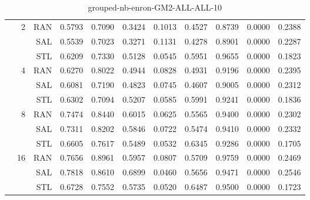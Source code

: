 \begin{center}
\begin{table}[htbp]
\begin{center}
\begin{tabular}{ | r | r | r | r | r | r | r | r | r | r | r |}
 & \multirow{3}{*}{2} & RAN & 0.5793 & 0.7090 & 0.3424 & 0.1013 & 0.4527 & 0.8739 & 0.0000 & 0.2388\\ \cline{3-11}
 &   & SAL & 0.5539 & 0.7023 & 0.3271 & 0.1131 & 0.4278 & 0.8901 & 0.0000 & 0.2287\\ \cline{3-11}
 &   & STL & 0.6209 & 0.7330 & 0.5128 & 0.0545 & 0.5951 & 0.9655 & 0.0000 & 0.1823\\ \cline{2-11}
 & \multirow{3}{*}{4} & RAN & 0.6270 & 0.8022 & 0.4944 & 0.0828 & 0.4931 & 0.9196 & 0.0000 & 0.2395\\ \cline{3-11}
 &   & SAL & 0.6081 & 0.7190 & 0.4823 & 0.0745 & 0.4607 & 0.9005 & 0.0000 & 0.2312\\ \cline{3-11}
 &   & STL & 0.6302 & 0.7094 & 0.5207 & 0.0585 & 0.5991 & 0.9241 & 0.0000 & 0.1836\\ \cline{2-11}
 & \multirow{3}{*}{8} & RAN & 0.7474 & 0.8440 & 0.6015 & 0.0625 & 0.5565 & 0.9400 & 0.0000 & 0.2302\\ \cline{3-11}
 &   & SAL & 0.7311 & 0.8202 & 0.5846 & 0.0722 & 0.5474 & 0.9410 & 0.0000 & 0.2332\\ \cline{3-11}
 &   & STL & 0.6605 & 0.7617 & 0.5489 & 0.0532 & 0.6345 & 0.9286 & 0.0000 & 0.1705\\ \cline{2-11}
 & \multirow{3}{*}{16} & RAN & 0.7656 & 0.8961 & 0.5957 & 0.0807 & 0.5709 & 0.9759 & 0.0000 & 0.2469\\ \cline{3-11}
 &   & SAL & 0.7818 & 0.8610 & 0.6899 & 0.0460 & 0.5656 & 0.9471 & 0.0000 & 0.2546\\ \cline{3-11}
 &   & STL & 0.6728 & 0.7552 & 0.5735 & 0.0520 & 0.6487 & 0.9500 & 0.0000 & 0.1723\\ \cline{2-11}
\hline
\end{tabular}
\caption{grouped-nb-enron-GM2-ALL-ALL-10}
\end{center}
 \end{table}
\end{center}

